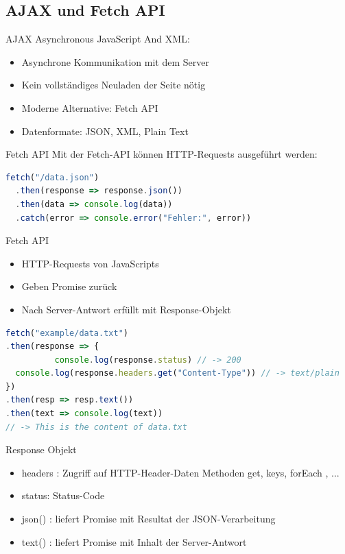 \subsection{AJAX und Fetch API}

\begin{concept}{AJAX}
    Asynchronous JavaScript And XML:
    \begin{itemize}
        \item Asynchrone Kommunikation mit dem Server
        \item Kein vollständiges Neuladen der Seite nötig
        \item Moderne Alternative: Fetch API
        \item Datenformate: JSON, XML, Plain Text
    \end{itemize}
\end{concept}

\begin{definition}{Fetch API}
Mit der Fetch-API können HTTP-Requests ausgeführt werden:
\begin{lstlisting}[language=JavaScript, style=basesmol]
fetch("/data.json")
  .then(response => response.json())
  .then(data => console.log(data))
  .catch(error => console.error("Fehler:", error))
\end{lstlisting}
\end{definition}

\begin{definition}{Fetch API}
\begin{itemize}
\item HTTP-Requests von JavaScripts
\item Geben Promise zurück
\item Nach Server-Antwort erfüllt mit Response-Objekt
\end{itemize}
\end{definition}
\begin{lstlisting}[language=JavaScript, style=basesmol]
fetch("example/data.txt")
.then(response => {
          console.log(response.status) // -> 200
  console.log(response.headers.get("Content-Type")) // -> text/plain
})
.then(resp => resp.text())
.then(text => console.log(text))
// -> This is the content of data.txt
\end{lstlisting}

Response Objekt

\begin{itemize}
\item headers : Zugriff auf HTTP-Header-Daten Methoden get, keys, forEach , ...
\item status: Status-Code
\item json() : liefert Promise mit Resultat der JSON-Verarbeitung
\item text() : liefert Promise mit Inhalt der Server-Antwort
\end{itemize}

